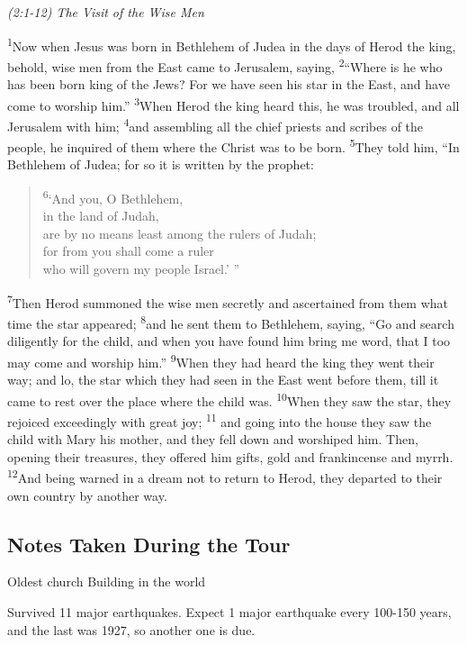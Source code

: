 \documentclass[letterpaper]{report}
\newcommand{\vs}[1]{\textsuperscript{#1}}
\begin{document}
{\centering
\emph{(2:1-12) The Visit of the Wise Men}\\
}
\begin{multicols}{2}
\vs{1}Now when Jesus was born in Bethlehem of Judea in the days of Herod the king,
behold, wise men from the East came to Jerusalem, saying,
\vs{2}``Where is he who has been born king of the Jews?
For we have seen his star in the East, and have come to worship him.''
\vs{3}When Herod the king heard this, he was troubled, and all Jerusalem with him;
\vs{4}and assembling all the chief priests and scribes of the people,
he inquired of them where the Christ was to be born.
\vs{5}They told him, ``In Bethlehem of Judea; for so it is written by the prophet:

\begin{verse}
\vs{6}`And you, O Bethlehem,\\
in the land of Judah,\\
are by no means least among the rulers of Judah;\\
for from you shall come a ruler\\
who will govern my people Israel.' ''\\ 
\end{verse}

\vs{7}Then Herod summoned the wise men secretly and ascertained from them what
time the star appeared;
\vs{8}and he sent them to Bethlehem, saying,
``Go and search diligently for the child,
and when you have found him bring me word,
that I too may come and worship him.''
\vs{9}When they had heard the king they went their way;
and lo, the star which they had seen in the East went before them,
till it came to rest over the place where the child was.
\vs{10}When they saw the star, they rejoiced exceedingly with great joy;
\vs{11} and going into the house they saw the child with Mary his mother,
and they fell down and worshiped him.
Then, opening their treasures, they offered him gifts,
gold and frankincense and myrrh.
\vs{12}And being warned in a dream not to return to Herod,
they departed to their own country by another way.
\end{multicols}

\subsection{Notes Taken During the Tour}

Oldest church Building in the world

Survived 11 major earthquakes. Expect 1 major earthquake every 100-150 years, and the last was 1927, so another one is due.
\end{document}
